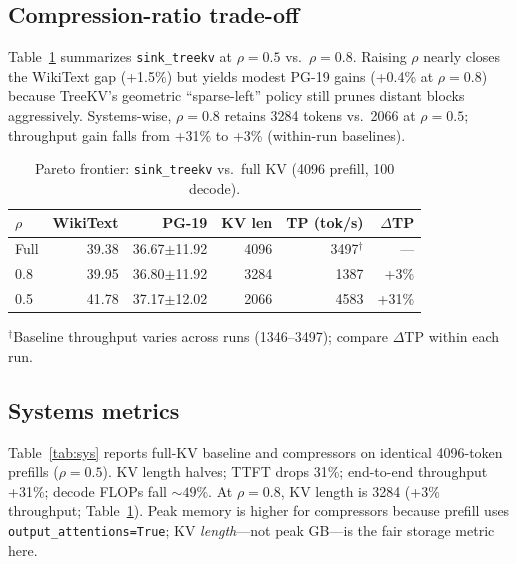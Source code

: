 \documentclass{article}
\begin{document}
\subsection{Compression-ratio trade-off}
Table~\ref{tab:pareto} summarizes \texttt{sink\_treekv} at $\rho{=}0.5$ vs.\ $\rho{=}0.8$.
Raising $\rho$ nearly closes the WikiText gap (+1.5\%) but yields modest PG-19 gains (+0.4\% at $\rho{=}0.8$) because TreeKV's geometric ``sparse-left'' policy still prunes distant blocks aggressively.
Systems-wise, $\rho{=}0.8$ retains 3284 tokens vs.\ 2066 at $\rho{=}0.5$; throughput gain falls from +31\% to +3\% (within-run baselines).

\begin{table}[t]
  \centering
  \caption{Pareto frontier: \texttt{sink\_treekv} vs.\ full KV (4096 prefill, 100 decode).}
  \label{tab:pareto}
  \small
  \setlength{\tabcolsep}{5pt}
  \begin{tabular}{@{}lrrrrr@{}}
    \toprule
    $\rho$ & WikiText & PG-19 & KV len & TP (tok/s) & $\Delta$TP \\
    \midrule
    Full & 39.38 & 36.67$\pm$11.92 & 4096 & 3497$^\dagger$ & --- \\
    0.8 & 39.95 & 36.80$\pm$11.92 & 3284 & 1387 & +3\% \\
    0.5 & 41.78 & 37.17$\pm$12.02 & 2066 & 4583 & +31\% \\
    \bottomrule
  \end{tabular}
  \vspace{2pt}

  {\footnotesize $^\dagger$Baseline throughput varies across runs (1346--3497); compare $\Delta$TP within each run.}
\end{table}

\subsection{Systems metrics}
Table~\ref{tab:sys} reports full-KV baseline and compressors on identical 4096-token prefills ($\rho{=}0.5$).
KV length halves; TTFT drops 31\%; end-to-end throughput +31\%; decode FLOPs fall ${\sim}49\%$.
At $\rho{=}0.8$, KV length is 3284 (+3\% throughput; Table~\ref{tab:pareto}).
Peak memory is higher for compressors because prefill uses \texttt{output\_attentions=True}; KV \emph{length}---not peak GB---is the fair storage metric here.
\end{document}
